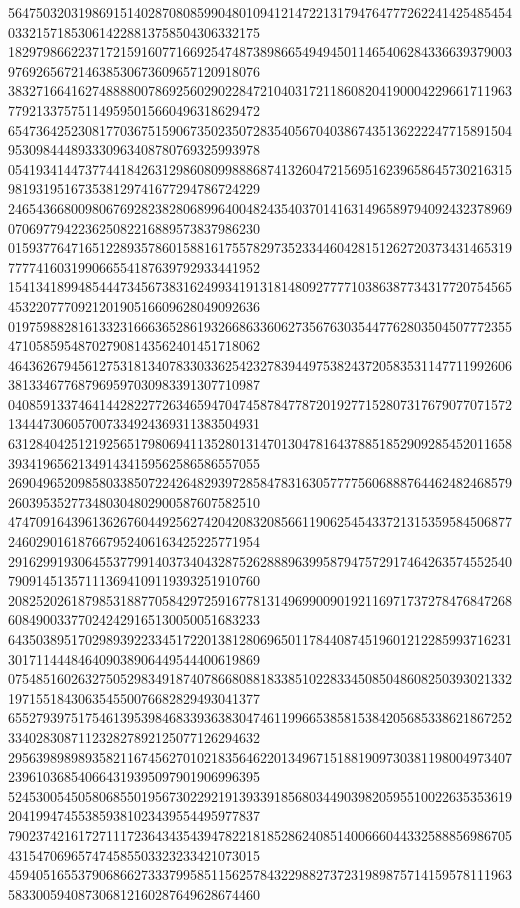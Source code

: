 \begin{DoxyCode}
      564750320319869151402870808599048010941214722131794764777262241425485454033215718530614228813758504306332175
      182979866223717215916077166925474873898665494945011465406284336639379003976926567214638530673609657120918076
      383271664162748888007869256029022847210403172118608204190004229661711963779213375751149595015660496318629472
      654736425230817703675159067350235072835405670403867435136222247715891504953098444893330963408780769325993978
      054193414473774418426312986080998886874132604721569516239658645730216315981931951673538129741677294786724229
      246543668009806769282382806899640048243540370141631496589794092432378969070697794223625082216889573837986230
      015937764716512289357860158816175578297352334460428151262720373431465319777741603199066554187639792933441952
      154134189948544473456738316249934191318148092777710386387734317720754565453220777092120190516609628049092636
      019759882816133231666365286193266863360627356763035447762803504507772355471058595487027908143562401451718062
      464362679456127531813407833033625423278394497538243720583531147711992606381334677687969597030983391307710987
      040859133746414428227726346594704745878477872019277152807317679077071572134447306057007334924369311383504931
      631284042512192565179806941135280131470130478164378851852909285452011658393419656213491434159562586586557055
      269049652098580338507224264829397285847831630577775606888764462482468579260395352773480304802900587607582510
      474709164396136267604492562742042083208566119062545433721315359584506877246029016187667952406163425225771954
      291629919306455377991403734043287526288896399587947572917464263574552540790914513571113694109119393251910760
      208252026187985318877058429725916778131496990090192116971737278476847268608490033770242429165130050051683233
      643503895170298939223345172201381280696501178440874519601212285993716231301711444846409038906449544400619869
      075485160263275052983491874078668088183385102283345085048608250393021332197155184306354550076682829493041377
      655279397517546139539846833936383047461199665385815384205685338621867252334028308711232827892125077126294632
      295639898989358211674562701021835646220134967151881909730381198004973407239610368540664319395097901906996395
      524530054505806855019567302292191393391856803449039820595510022635353619204199474553859381023439554495977837
      790237421617271117236434354394782218185286240851400666044332588856986705431547069657474585503323233421073015
      459405165537906866273337995851156257843229882737231989875714159578111963583300594087306812160287649628674460

\end{DoxyCode}
